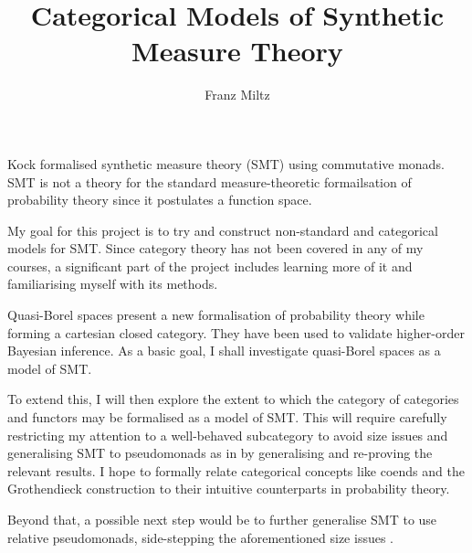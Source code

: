 \documentclass{article}
\begin{document}
\title{Categorical Models of Synthetic Measure Theory}
\author{Franz Miltz}
\maketitle

Kock formalised synthetic measure theory (SMT) using commutative monads. \cite{kock2011commutative}
SMT is not a theory for the standard measure-theoretic formailsation of probability theory since it 
postulates a function space.

My goal for this project is to try and construct non-standard and categorical models for SMT. 
Since category theory has not been covered in any of my courses, a significant part of the project 
includes learning more of it and familiarising myself with its methods.

Quasi-Borel spaces present a new formalisation of probability theory while forming a cartesian 
closed category. \cite{DBLP:journals/corr/HeunenKSY17} 
They have been used to validate higher-order Bayesian inference. \cite{DBLP:journals/corr/abs-1711-03219}
As a basic goal, I shall investigate quasi-Borel spaces as a model of SMT.

To extend this, I will then explore the extent to which the category of categories and functors may
be formalised as a model of SMT. 
This will require carefully restricting my attention to a well-behaved subcategory to avoid size 
issues and generalising SMT to pseudomonads as in \cite{Marmolejo_no-iterationpseudomonads} by 
generalising and re-proving the relevant results. 
I hope to formally relate categorical concepts like coends and the Grothendieck construction to 
their intuitive counterparts in probability theory. 

Beyond that, a possible next step would be to further generalise SMT to use relative pseudomonads,
side-stepping the aforementioned size issues \cite{Fiore_relative-pseudomonads2017}.

{}

\end{document}
